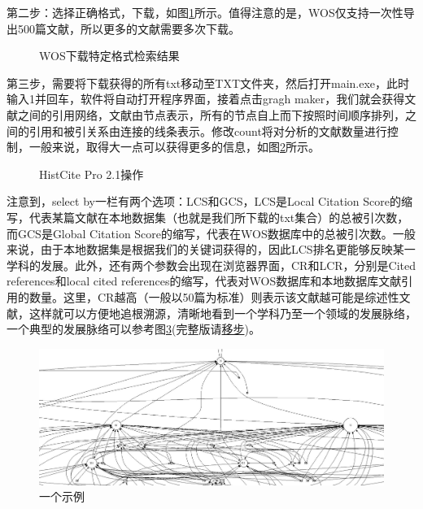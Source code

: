 \documentclass[UTF8]{ctexbook}
\begin{document}
第二步：选择正确格式，下载，如图\ref{fig:2}所示。值得注意的是，WOS仅支持一次性导出500篇文献，所以更多的文献需要多次下载。

\begin{figure}[!htb]
	\centering
	\vspace{-0.3cm}
	\caption{WOS下载特定格式检索结果}\label{fig:2}
\end{figure}

第三步，需要将下载获得的所有txt移动至TXT文件夹，然后打开main.exe，此时输入1并回车，软件将自动打开程序界面，接着点击gragh maker，我们就会获得文献之间的引用网络，文献由节点表示，所有的节点自上而下按照时间顺序排列，之间的引用和被引关系由连接的线条表示。修改count将对分析的文献数量进行控制，一般来说，取得大一点可以获得更多的信息，如图\ref{fig:3}所示。

\begin{figure}[!htb]
	\centering
	\vspace{-0.3cm}
	\caption{HistCite Pro 2.1操作}\label{fig:3}
\end{figure}


注意到，select by一栏有两个选项：LCS和GCS，LCS是Local Citation Score的缩写，代表某篇文献在本地数据集（也就是我们所下载的txt集合）的总被引次数，而GCS是Global Citation Score的缩写，代表在WOS数据库中的总被引次数。一般来说，由于本地数据集是根据我们的关键词获得的，因此LCS排名更能够反映某一学科的发展。此外，还有两个参数会出现在浏览器界面，CR和LCR，分别是Cited references和local cited references的缩写，代表对WOS数据库和本地数据库文献引用的数量。这里，CR越高（一般以50篇为标准）则表示该文献越可能是综述性文献，这样就可以方便地追根溯源，清晰地看到一个学科乃至一个领域的发展脉络，一个典型的发展脉络可以参考图\ref{fig:typical_trace}(完整版请\href{https://raw.githubusercontent.com/lonelybag/Latex_lonelybag/dev/Script/002_NOTE_of_MASTER/Figure/typical_trace_full.jpg}{移步})。

\begin{figure}[!htb]
	\centering
	\includegraphics[width=1\linewidth]{Figure/typical_trace.JPG}
	\vspace{-0.3cm}
	\caption{一个示例}\label{fig:typical_trace}
\end{figure}
\end{document}
